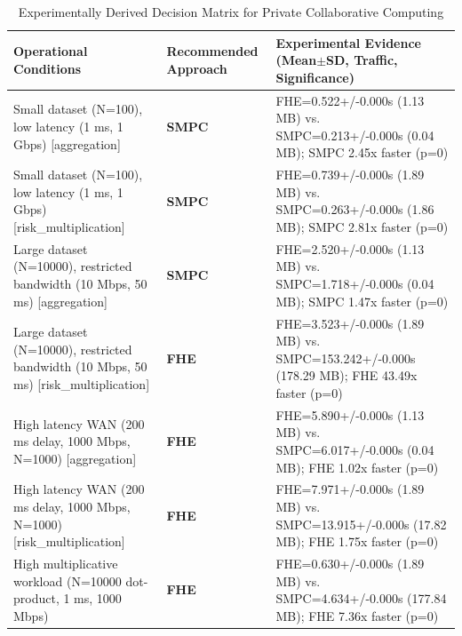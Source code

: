 \documentclass[conference]{IEEEtran}
\begin{document}
\begin{table}[htbp]
\caption{Experimentally Derived Decision Matrix for Private Collaborative Computing}
\label{tab:decision_matrix}
\centering
\scriptsize
\begin{tabular}{@{}p{}p{}p{}@{}}
\toprule
\textbf{Operational Conditions} & \textbf{Recommended Approach} & \textbf{Experimental Evidence (Mean$\pm$SD, Traffic, Significance)} \\
\midrule
Small dataset (N=100), low latency (1 ms, 1 Gbps) [aggregation] & \textbf{SMPC} & FHE=0.522+/-0.000s (1.13 MB) vs. SMPC=0.213+/-0.000s (0.04 MB); SMPC 2.45x faster (p=0) \\
Small dataset (N=100), low latency (1 ms, 1 Gbps) [risk\_multiplication] & \textbf{SMPC} & FHE=0.739+/-0.000s (1.89 MB) vs. SMPC=0.263+/-0.000s (1.86 MB); SMPC 2.81x faster (p=0) \\
Large dataset (N=10000), restricted bandwidth (10 Mbps, 50 ms) [aggregation] & \textbf{SMPC} & FHE=2.520+/-0.000s (1.13 MB) vs. SMPC=1.718+/-0.000s (0.04 MB); SMPC 1.47x faster (p=0) \\
Large dataset (N=10000), restricted bandwidth (10 Mbps, 50 ms) [risk\_multiplication] & \textbf{FHE} & FHE=3.523+/-0.000s (1.89 MB) vs. SMPC=153.242+/-0.000s (178.29 MB); FHE 43.49x faster (p=0) \\
High latency WAN (200 ms delay, 1000 Mbps, N=1000) [aggregation] & \textbf{FHE} & FHE=5.890+/-0.000s (1.13 MB) vs. SMPC=6.017+/-0.000s (0.04 MB); FHE 1.02x faster (p=0) \\
High latency WAN (200 ms delay, 1000 Mbps, N=1000) [risk\_multiplication] & \textbf{FHE} & FHE=7.971+/-0.000s (1.89 MB) vs. SMPC=13.915+/-0.000s (17.82 MB); FHE 1.75x faster (p=0) \\
High multiplicative workload (N=10000 dot-product, 1 ms, 1000 Mbps) & \textbf{FHE} & FHE=0.630+/-0.000s (1.89 MB) vs. SMPC=4.634+/-0.000s (177.84 MB); FHE 7.36x faster (p=0) \\
\bottomrule
\end{tabular}
\end{table}
\end{document}
